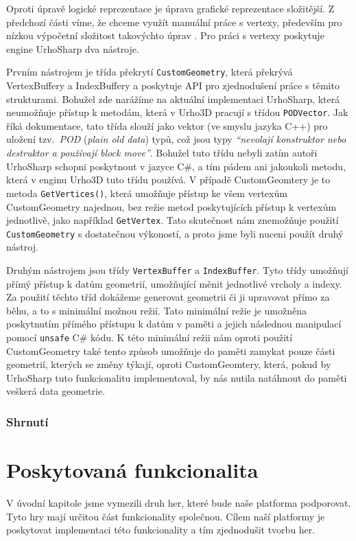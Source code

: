 Oproti úpravě logické reprezentace je úprava grafické reprezentace složitější. Z předchozí části víme, že chceme využít manuální práce s vertexy, především pro nízkou výpočetní složitost takovýchto úprav . Pro práci s vertexy poskytuje engine UrhoSharp dva nástroje. 

Prvním nástrojem je třída překrytí \texttt{CustomGeometry}, která překrývá VertexBuffery a IndexBuffery a poskytuje API pro zjednodušení práce s těmito strukturami. Bohužel zde narážíme na aktuální implementaci UrhoSharp, která neumožňuje přístup k metodám, která v Urho3D pracují s třídou \texttt{PODVector}. Jak říká dokumentace, tato třída slouží jako vektor (ve smyslu jazyka C++) pro uložení tzv.~\textit{POD} (\textit{plain old data}) typů, což jsou typy \textit{``nevolají konstruktor nebo destruktor a používají block move''}\citep{site:urho3DPOD}. Bohužel tuto třídu nebyli zatím autoři UrhoSharp schopni poskytnout v jazyce C\#, a tím pádem ani jakoukoli metodu, která v enginu Urho3D tuto třídu používá. V případě CustomGeomtery je to metoda \texttt{GetVertices()}, která umožňuje přístup ke všem vertexům CustomGeometry najednou, bez režie metod poskytujících přístup k vertexům jednotlivě, jako například \texttt{GetVertex}. Tato skutečnost nám znemožňuje použití \texttt{CustomGeometry} s dostatečnou výkoností, a proto jsme byli nuceni použít druhý nástroj.

Druhým nástrojem jsou třídy \texttt{VertexBuffer} a \texttt{IndexBuffer}. Tyto třídy umožňují přímý přístup k datům geometrií, umožňující měnit jednotlivé vrcholy a indexy. Za použití těchto tříd dokážeme generovat geometrii či ji upravovat přímo za běhu, a to s minimální možnou režií. Tato minimální režie je umožněna poskytnutím přímého přístupu k datům v paměti a jejich následnou manipulací pomocí \texttt{unsafe} C\# kódu. K této minimální režii nám oproti použití CustomGeometry také tento způsob umožňuje do paměti zamykat pouze části geometrií, kterých se změny týkají, oproti CustomGeomtery, která, pokud by UrhoSharp tuto funkcionalitu implementoval, by nás nutila natáhnout do paměti veškerá data geometrie.

\subsubsection{Shrnutí}



\section{Poskytovaná funkcionalita}
V úvodní kapitole jsme vymezili druh her, které bude naše platforma podporovat. Tyto hry mají určitou část funkcionality společnou. Cílem naší platformy je poskytovat implementaci této funkcionality a tím zjednodušit tvorbu her.


